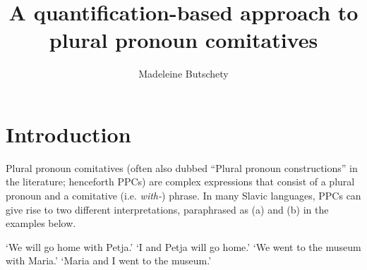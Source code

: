 \documentclass[output=paper,colorlinks,citecolor=brown]{langscibook}
\author{Madeleine Butschety\orcid{0009-0006-6439-627X}
\affiliation{University of Nova Gorica}}
\title{A quantification-based approach to plural pronoun comitatives}
\begin{document}
\maketitle

%


\section{Introduction}
Plural pronoun comitatives (often also dubbed ``Plural pronoun constructions'' in the literature; henceforth PPCs) are complex expressions that consist of a plural pronoun and a comitative (i.e. \textit{with-}) phrase. In many Slavic languages, PPCs can give rise to two different interpretations, paraphrased as (a) and (b) in the examples below. 

\label{ini:russian}
\ea `We will go home with Petja.'
\ex `I and Petja will go home.'
\z \z
{}\label{ini:torlakian}
\ea `We went to the museum with Maria.'
\ex `Maria and I went to the museum.'
\z \z 
\end{document}
